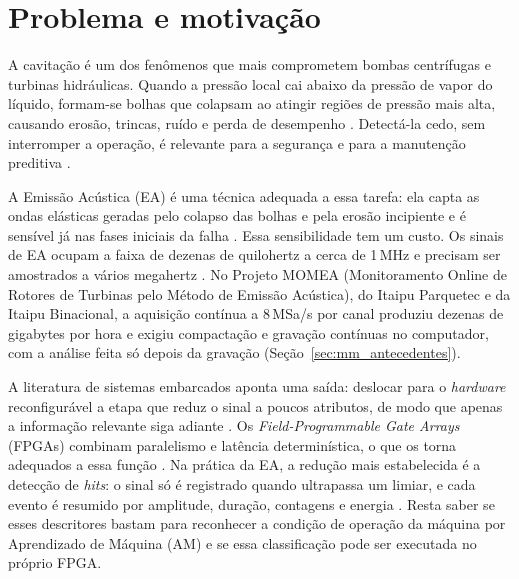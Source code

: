 
\section{Problema e motivação}
\label{sec:formulacao}
\label{sec:motivacao}

A cavitação é um dos fenômenos que mais comprometem bombas centrífugas e turbinas hidráulicas. Quando a pressão local cai abaixo da pressão de vapor do líquido, formam-se bolhas que colapsam ao atingir regiões de pressão mais alta, causando erosão, trincas, ruído e perda de desempenho \cite{brennen1995,liu2023review}. Detectá-la cedo, sem interromper a operação, é relevante para a segurança e para a manutenção preditiva \cite{mba2006development}.

A Emissão Acústica (EA) é uma técnica adequada a essa tarefa: ela capta as ondas elásticas geradas pelo colapso das bolhas e pela erosão incipiente e é sensível já nas fases iniciais da falha \cite{Neill1997Detection,Alfayez2005ndt,FernandezOsete2024}. Essa sensibilidade tem um custo. Os sinais de EA ocupam a faixa de dezenas de quilohertz a cerca de 1\,MHz e precisam ser amostrados a vários megahertz \cite{grosse2008acoustic}. No Projeto MOMEA (Monitoramento Online de Rotores de Turbinas pelo Método de Emissão Acústica), do Itaipu Parquetec e da Itaipu Binacional, a aquisição contínua a 8\,MSa/s por canal produziu dezenas de gigabytes por hora e exigiu compactação e gravação contínuas no computador, com a análise feita só depois da gravação (Seção~\ref{sec:mm_antecedentes}).

A literatura de sistemas embarcados aponta uma saída: deslocar para o \textit{hardware} reconfigurável a etapa que reduz o sinal a poucos atributos, de modo que apenas a informação relevante siga adiante \cite{kang2015,wirtz2018,toumi2022fpga}. Os \textit{Field-Programmable Gate Arrays} (FPGAs) combinam paralelismo e latência determinística, o que os torna adequados a essa função \cite{trimberger2015three,Shawahna2019}. Na prática da EA, a redução mais estabelecida é a detecção de \textit{hits}: o sinal só é registrado quando ultrapassa um limiar, e cada evento é resumido por amplitude, duração, contagens e energia \cite{unnthorsson2013,vallen2022}. Resta saber se esses descritores bastam para reconhecer a condição de operação da máquina por Aprendizado de Máquina (AM) e se essa classificação pode ser executada no próprio FPGA.

